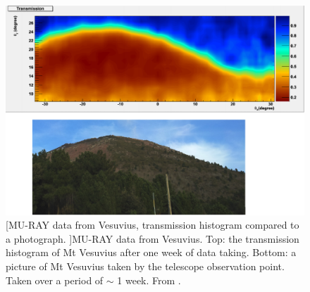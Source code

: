 \begin{figure}[!h]
 \centering
 \includegraphics[width=0.8\linewidth]{Chapter5/Figs/Raster/mtVesuviusMuRayTransmission.png}
 [MU-RAY data from Vesuvius, transmission histogram compared to a photograph. ]{MU-RAY data from Vesuvius. Top: the transmission histogram of Mt Vesuvius after one week of data taking. Bottom: a picture of Mt Vesuvius taken by the telescope observation point. Taken over a period of $\sim$ 1 week. From  \cite{Ambrosino_2014}.} 
 \label{fig:mtVesuviusMuRayTransmission}
\end{figure}
